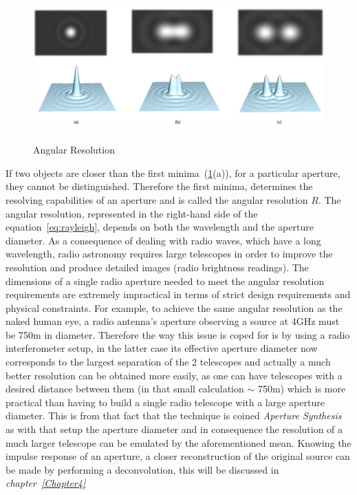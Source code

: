 \begin{figure}[htbp]

  \begin{center}
    \includegraphics[scale= 0.75]{Figures/angres}
  \end{center}
  
 	\caption[Angular Resolution]{\\Angular Resolution~\citep[Appendix~B.1,~Fig.~B.3]{woods2010accelerating}}
	\label{fig:Ang}
\end{figure}
If two objects are closer than the first minima~(\ref{fig:Ang}{\color{blue}(a)}), for a particular
aperture, they cannot be distinguished. Therefore the first minima, determines the resolving
capabilities of an aperture and is called the angular resolution $R$. The angular
resolution, represented in the right-hand side of the equation~\ref{eq:rayleigh}, depends on both the wavelength
and the aperture diameter. As a consequence of dealing with radio waves, which have a long wavelength, radio astronomy requires large telescopes in order to improve the resolution and produce detailed images (radio brightness readings). The dimensions of a single radio aperture needed to meet the angular resolution requirements are extremely impractical in terms of strict design requirements and physical constraints. For example, to achieve the same angular resolution as the naked human eye, a radio antenna’s aperture observing a source at 4GHz must be 750m in diameter. Therefore the way this issue is coped for is by using a radio interferometer setup, in the latter case its effective aperture diameter now corresponds to the largest separation of the 2 telescopes and actually a much better resolution can be obtained more easily, as one can have telescopes with a desired distance between them (in that small calculation $\sim$ 750m) which is more practical than having to build a single radio telescope with a large aperture diameter. This is from that fact that the technique is coined \textit{Aperture Synthesis} as with that setup the aperture diameter and in consequence the resolution of a much larger telescope can be emulated by the aforementioned mean.  Knowing the impulse response of an aperture, a closer reconstruction of the original source can be made by performing a deconvolution, this will be discussed in \textit{chapter~\ref{Chapter4}}

